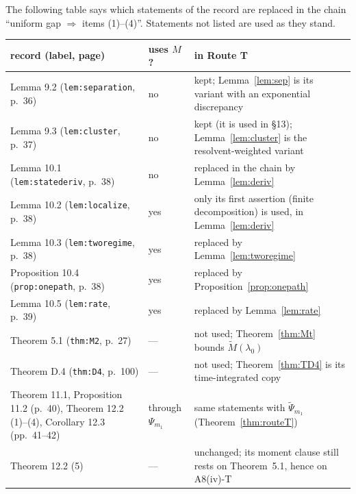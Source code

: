 \documentclass[11pt,a4paper]{article}
\newcommand{\Mt}{\widetilde M}                %
\newcommand{\Psit}{\widetilde\Psi}
\theoremstyle{plain}
\theoremstyle{definition}
\begin{document}
The following table says which statements of the record are replaced in the chain
``uniform gap $\Rightarrow$ items (1)--(4)''.  Statements not listed are used as they stand.

\begin{center}\small
\begin{tabular}{@{}p{}p{}p{}@{}}
\toprule
record (label, page) & uses $M$? & in Route T\\
\midrule
Lemma 9.2 (\texttt{lem:separation}, p.~36) & no & kept; Lemma~\ref{lem:sep} is its variant
with an exponential discrepancy\\
Lemma 9.3 (\texttt{lem:cluster}, p.~37) & no & kept (it is used in \S13); Lemma~\ref{lem:cluster}
is the resolvent-weighted variant\\
Lemma 10.1 (\texttt{lem:statederiv}, p.~38) & no & replaced in the chain by
Lemma~\ref{lem:deriv}\\
Lemma 10.2 (\texttt{lem:localize}, p.~38) & yes & only its first assertion (finite
decomposition) is used, in Lemma~\ref{lem:deriv}\\
Lemma 10.3 (\texttt{lem:tworegime}, p.~38) & yes & replaced by Lemma~\ref{lem:tworegime}\\
Proposition 10.4 (\texttt{prop:onepath}, p.~38) & yes & replaced by
Proposition~\ref{prop:onepath}\\
Lemma 10.5 (\texttt{lem:rate}, p.~39) & yes & replaced by Lemma~\ref{lem:rate}\\
Theorem 5.1 (\texttt{thm:M2}, p.~27) & --- & not used; Theorem~\ref{thm:Mt} bounds
$\Mt(\lambda_0)$\\
Theorem D.4 (\texttt{thm:D4}, p.~100) & --- & not used; Theorem~\ref{thm:TD4} is its
time-integrated copy\\
Theorem 11.1, Proposition 11.2 (p.~40), Theorem 12.2 (1)--(4), Corollary 12.3 (pp.~41--42) &
through $\Psi_{m_1}$ & same statements with $\Psit_{m_1}$ (Theorem~\ref{thm:routeT})\\
Theorem 12.2 (5) & --- & unchanged; its moment clause still rests on Theorem~5.1, hence on
A8(iv)-T\\
\bottomrule
\end{tabular}
\end{center}
\end{document}
